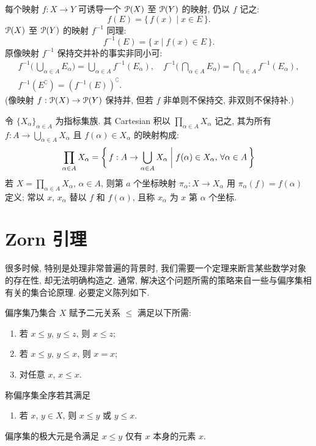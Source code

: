 \documentclass[twoside, fontset=fandol, punct=kaiming]{ctexbook}
\let \mathcal \EuScript
\theoremstyle{innocent}
\begin{document}
每个映射 $f:X\to Y$ 可诱导一个 $\mathcal P(X)$ 至 $\mathcal P(Y)$ 的映射, 仍以 $f$ 记之:
\[f(E)=\{\,f(x)\mid x\in E\,\}.\]
$\mathcal P(X)$ 至 $\mathcal P(Y)$ 的映射 $f^{-1} $ 同理:
\[f^{-1} (E) = \{\,x\mid f(x)\in E\,\}.\]
原像映射 $f^{-1} $ 保持交并补的事实非同小可:
\begin{gather*}
    f^{-1} \biggl(\, \bigcup_{\alpha\in A}E_\alpha \biggr)  = \bigcup_{\alpha\in A}f^{-1} (E_\alpha),\quad
    f^{-1} \biggl(\, \bigcap_{\alpha\in A}E_\alpha \biggr)  = \bigcap_{\alpha\in A}f^{-1} (E_\alpha), \\
    f^{-1} (E^\complement)                               = \left( f^{-1} (E) \right)^\complement.
\end{gather*}
(像映射 $f:\mathcal P(X)\to \mathcal P(Y)$ 保持并, 但若 $f$ 非单则不保持交, 非双则不保持补.)

令 $\{X_\alpha\}_{\alpha\in A}$ 为指标集族. 其 Cartesian 积以 $\prod_{\alpha\in A}X_\alpha$ 记之, 其为所有 $f:A\to \bigcup _{\alpha\in A}X_\alpha$ 且 $f(\alpha)\in X_\alpha$ 的映射构成:
\[\prod_{\alpha\in A}X_\alpha =\biggl\{ \,f:A\to \bigcup _{\alpha\in A}X_\alpha\biggm| f(\alpha)\in X_\alpha,\,\forall \alpha\in A\, \biggr\} \]
若 $X=\prod_{\alpha\in A}X_\alpha$, $\alpha\in A$, 则第 $a$ 个坐标映射 $\pi _\alpha:X\to X_\alpha$ 用 $\pi _\alpha(f)=f(\alpha)$ 定义; 常以 $x$, $x_\alpha$ 替以 $f$ 和 $f(\alpha)$, 且称 $x_\alpha$ 为 $x$ 第 $\alpha$ 个坐标.
\section{Zorn 引理}
很多时候, 特别是处理非常普遍的背景时, 我们需要一个定理来断言某些数学对象的存在性, 却无法明确构造之. 通常, 解决这个问题所需的策略来自一些与偏序集相有关的集合论原理. 必要定义陈列如下.

偏序集乃集合 $X$ 赋予二元关系 $\leqslant $ 满足以下所需:
\begin{enumerate}
    \item 若 $x\leqslant y$, $y\leqslant z$, 则 $x\leqslant z$;
    \item 若 $x\leqslant y$, $y\leqslant x$, 则 $x= x$;
    \item 对任意 $x$, $x\leqslant x$.
\end{enumerate}
称偏序集全序若其满足
\begin{enumerate}[resume]
    \item 若 $x$, $y\in X$, 则 $x\leqslant y$ 或 $y\leqslant x$.
\end{enumerate}
偏序集的极大元是令满足 $x\leqslant y$ 仅有 $x$ 本身的元素 $x$.
\end{document}
